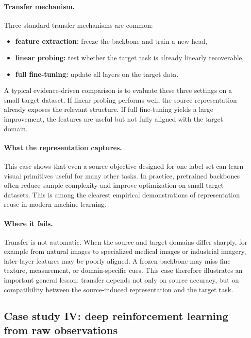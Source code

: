 \paragraph{Transfer mechanism.}
Three standard transfer mechanisms are common:
\begin{itemize}
    \item \textbf{feature extraction:} freeze the backbone and train a new head,
    \item \textbf{linear probing:} test whether the target task is already linearly recoverable,
    \item \textbf{full fine-tuning:} update all layers on the target data.
\end{itemize}
A typical evidence-driven comparison is to evaluate these three settings on a small target dataset.
If linear probing performs well, the source representation already exposes the relevant structure.
If full fine-tuning yields a large improvement, the features are useful but not fully aligned with the target domain.

\paragraph{What the representation captures.}
This case shows that even a source objective designed for one label set can learn visual primitives useful for many other tasks.
In practice, pretrained backbones often reduce sample complexity and improve optimization on small target datasets.
This is among the clearest empirical demonstrations of representation reuse in modern machine learning.

\paragraph{Where it fails.}
Transfer is not automatic.
When the source and target domains differ sharply, for example from natural images to specialized medical images or industrial imagery, later-layer features may be poorly aligned.
A frozen backbone may miss fine texture, measurement, or domain-specific cues.
This case therefore illustrates an important general lesson:
transfer depends not only on source accuracy, but on compatibility between the source-induced representation and the target task.

\subsection*{Case study IV: deep reinforcement learning from raw observations}

